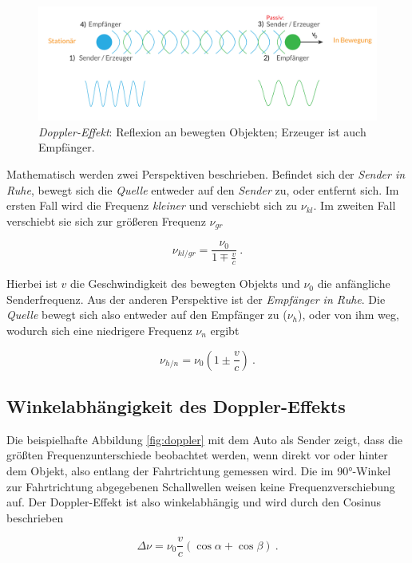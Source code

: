 \begin{figure}
    \centering
    \includegraphics[width=.95\textwidth]{media/doppler_SE.pdf}
    \caption{\textit{Doppler-Effekt}: Reflexion an bewegten Objekten; Erzeuger ist auch Empfänger.}
    \label{fig:se}
\end{figure}

Mathematisch werden zwei Perspektiven beschrieben. Befindet sich der \textit{Sender in Ruhe}, bewegt sich die \textit{Quelle} entweder auf den \textit{Sender} zu, oder entfernt sich.
Im ersten Fall wird die Frequenz \textit{kleiner} und verschiebt sich zu $\nu_{kl}$. Im zweiten Fall verschiebt sie sich zur größeren Frequenz $\nu_{gr}$

\begin{equation*}
    \nu_{kl/gr} = \frac{\nu_0}{1 \mp \frac{v}{c}} \:.
\end{equation*}

Hierbei ist $v$ die Geschwindigkeit des bewegten Objekts und $\nu_0$ die anfängliche Senderfrequenz.
Aus der anderen Perspektive ist der \textit{Empfänger in Ruhe}. Die \textit{Quelle} bewegt sich also entweder auf den Empfänger zu ($\nu_h$), oder von ihm weg, wodurch sich eine niedrigere
Frequenz $\nu_n$ ergibt

\begin{equation*}
    \nu_{h/n} = \nu_0 (1 \pm \frac{v}{c}) \:.
\end{equation*}

\subsection{Winkelabhängigkeit des Doppler-Effekts}
Die beispielhafte Abbildung \ref{fig:doppler} mit dem Auto als Sender zeigt, dass die größten Frequenzunterschiede beobachtet werden, wenn direkt vor oder hinter dem Objekt,
also entlang der Fahrtrichtung gemessen wird. Die im 90°-Winkel zur Fahrtrichtung abgegebenen Schallwellen weisen keine Frequenzverschiebung auf. Der Doppler-Effekt ist also winkelabhängig und wird
durch den Cosinus beschrieben

\begin{equation*}
    \Delta \nu = \nu_0 \frac{v}{c}(\cos{\alpha} + \cos{\beta}) \:.
\end{equation*}

